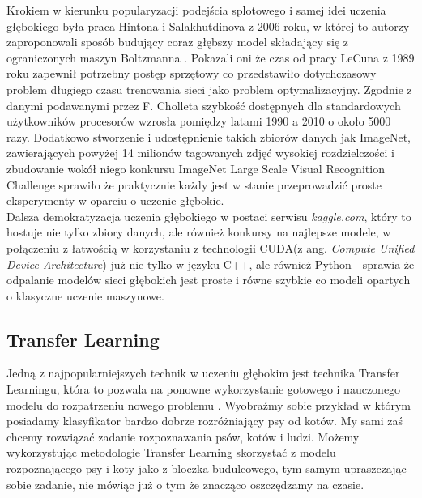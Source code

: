 Krokiem w kierunku popularyzacji podejścia splotowego i samej idei uczenia głębokiego była praca Hintona i Salakhutdinova z 2006 roku, w której to autorzy zaproponowali sposób budujący coraz głębszy model składający
się z ograniczonych maszyn Boltzmanna \cite{hinton}. Pokazali oni że czas od pracy LeCuna z 1989 roku \cite{lecun} zapewnił potrzebny postęp sprzętowy co przedstawiło dotychczasowy problem długiego czasu trenowania sieci jako problem optymalizacyjny. Zgodnie z danymi podawanymi przez F. Cholleta \cite{deep} szybkość dostępnych dla standardowych użytkowników procesorów wzrosła pomiędzy latami 1990 a 2010 o około 5000 razy. Dodatkowo stworzenie i udostępnienie takich zbiorów danych jak ImageNet, zawierających powyżej 14 milionów tagowanych zdjęć wysokiej rozdzielczości i zbudowanie wokół niego konkursu ImageNet Large Scale Visual Recognition Challenge \cite{imagenet} sprawiło że praktycznie każdy jest w stanie przeprowadzić proste eksperymenty w oparciu o uczenie głębokie. \\

Dalsza demokratyzacja uczenia głębokiego w postaci serwisu \textit{kaggle.com}, który to hostuje nie tylko zbiory danych, ale również konkursy na najlepsze modele, w połączeniu z łatwością w korzystaniu z technologii CUDA(z ang. \textit{Compute Unified Device Architecture}) już nie tylko w języku C++, ale również Python - sprawia że odpalanie modelów sieci głębokich jest proste i równe szybkie co modeli opartych o klasyczne uczenie maszynowe\cite{deep}.

\subsection{Transfer Learning}

Jedną z najpopularniejszych technik w uczeniu głębokim jest technika Transfer Learningu, która to pozwala na ponowne wykorzystanie gotowego i nauczonego modelu do rozpatrzeniu nowego problemu \cite{hands_on}. Wyobraźmy sobie przykład w którym posiadamy klasyfikator bardzo dobrze rozróżniający psy od kotów. My sami zaś chcemy rozwiązać zadanie rozpoznawania psów, kotów i ludzi. Możemy wykorzystując metodologie Transfer Learning skorzystać z modelu rozpoznającego psy i koty jako z bloczka budulcowego, tym samym upraszczając sobie zadanie, nie mówiąc już o tym że znacząco oszczędzamy na czasie.

